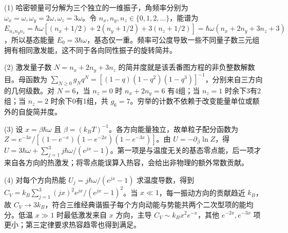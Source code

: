 (1) 哈密顿量可分解为三个独立的一维振子，角频率分别为 \(\omega_x=\omega,\omega_y=2\omega,\omega_z=3\omega\)。令 \(n_x,n_y,n_z\in\{0,1,2,\ldots\}\)，能谱为 \(E_{n_xn_yn_z}=\hbar\omega[(n_x+1/2)+2(n_y+1/2)+3(n_z+1/2)]=\hbar\omega(n_x+2n_y+3n_z+3)\)，所以基态能量 \(E_0=3\hbar\omega\)，基态仅一重。频率可公度导致一些不同量子数三元组拥有相同激发能，这不同于各向同性振子的旋转简并。

(2) 激发量子数 \(N=n_x+2n_y+3n_z\) 的简并度就是该丢番图方程的非负整数解数目。母函数为 \(\sum_{N\ge0}g_Nq^N=[(1-q)(1-q^2)(1-q^3)]^{-1}\)，分别来自三方向的几何级数。对 \(N=6\)，当 \(n_z=0\) 时 \(n_x+2n_y=6\) 有4组；当 \(n_z=1\) 时余下3有2组；当 \(n_z=2\) 时余下0有1组，共 \(g_6=7\)。穷举的计数不依赖于改变能量单位或额外的自旋简并度。

(3) 设 \(x=\beta\hbar\omega\) 且 \(\beta=(k_BT)^{-1}\)。各方向能量独立，故单粒子配分函数为 \(Z=e^{-3x}/[(1-e^{-x})(1-e^{-2x})(1-e^{-3x})]\)。由 \(U=-\partial_\beta\ln Z\)，得 \(U=3\hbar\omega+\sum_{j=1}^3 j\hbar\omega/(e^{jx}-1)\)。第一项是与温度无关的基态零点能，后一项才来自各方向的热激发；将零点能误算入热容，会给出非物理的额外常数贡献。

(4) 对每个方向热能 \(U_j=j\hbar\omega/(e^{jx}-1)\) 求温度导数，得到 \(C_V=k_B\sum_{j=1}^3(jx)^2 e^{jx}/(e^{jx}-1)^2\)。当 \(x\ll1\)，每一振动方向的贡献趋近 \(k_B\)，故 \(C_V\to3k_B\)，符合三维经典谐振子每个方向动能与势能共两个二次型项的能均分。低温 \(x\gg1\) 时最低激发来自 \(x\) 方向，主导 \(C_V\sim k_Bx^2e^{-x}\)，其他 \(e^{-2x},e^{-3x}\) 项更小；第三定律要求热容趋零也得到满足。
